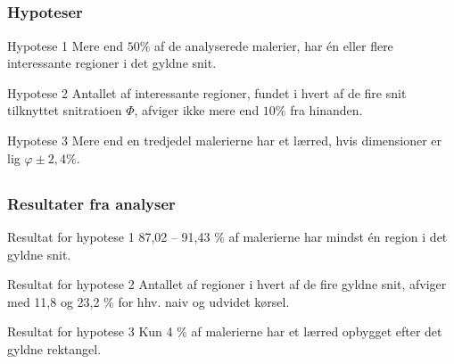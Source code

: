 \documentclass[xcolor=table]{beamer}
\begin{document}
\subsection*{}
\begin{frame}

    \frametitle{Hypoteser}

    \begin{block}{Hypotese 1}
        Mere end \alert{$50\%$} af de analyserede malerier, har én eller flere
        interessante regioner i det gyldne snit.
    \end{block}

    \begin{block}{Hypotese 2}
        Antallet af interessante regioner, fundet i hvert af de fire snit
        tilknyttet snitratioen $\varPhi$, afviger ikke mere end \alert{$10\%$} fra
        hinanden.
    \end{block}

    \begin{block}{Hypotese 3}
        Mere end \alert{en tredjedel} malerierne har et lærred, hvis
        dimensioner er lig $\varphi\pm2,4\%$.
    \end{block}

\end{frame}

\subsection*{}
\begin{frame}

    \frametitle{Resultater fra analyser}

    \begin{block}{Resultat for hypotese 1\hspace{14em}}
        87,02 -- 91,43 \% af malerierne har mindst én region i det gyldne snit.
    \end{block}

    \begin{block}{Resultat for hypotese 2\hspace{16em}}
        Antallet af regioner i hvert af de fire gyldne snit, afviger med 11,8 og 23,2 \% for hhv. naiv og udvidet kørsel.
    \end{block}

    \begin{block}{Resultat for hypotese 3\hspace{16em}}
        Kun 4 \% af malerierne har et lærred opbygget efter det gyldne rektangel.
    \end{block}

\end{frame}
\end{document}
